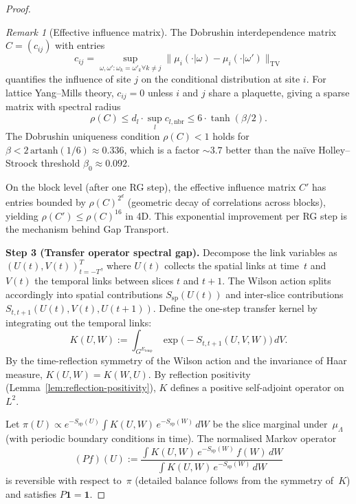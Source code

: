 \documentclass[12pt,a4paper]{article}
\theoremstyle{definition}
\theoremstyle{plain}
\theoremstyle{remark}
\newtheorem{remark}[definition]{Remark}
\begin{document}
\begin{proof}
\begin{remark}[Effective influence matrix]
\label{rem:influence-matrix}
The Dobrushin interdependence matrix $C = (c_{ij})$ with entries
\[
c_{ij} = \sup_{\omega, \omega': \omega_k = \omega'_k \forall k \neq j} \| \mu_i(\cdot | \omega) - \mu_i(\cdot | \omega') \|_{\mathrm{TV}}
\]
quantifies the influence of site $j$ on the conditional distribution at site $i$. For lattice Yang--Mills theory, $c_{ij} = 0$ unless $i$ and $j$ share a plaquette, giving a sparse matrix with spectral radius
\[
\rho(C) \leq d_l \cdot \sup_{l} c_{l, \mathrm{nbr}} \leq 6 \cdot \tanh(\beta/2).
\]
The Dobrushin uniqueness condition $\rho(C) < 1$ holds for $\beta < 2\,\mathrm{artanh}(1/6) \approx 0.336$, which is a factor $\sim 3.7$ better than the na\"ive Holley--Stroock threshold $\beta_0 \approx 0.092$.

On the block level (after one RG step), the effective influence matrix $C'$ has entries bounded by $\rho(C)^{2^d}$ (geometric decay of correlations across blocks), yielding $\rho(C') \leq \rho(C)^{16}$ in 4D. This exponential improvement per RG step is the mechanism behind Gap Transport.
\end{remark}

\medskip
\noindent\textbf{Step 3 (Transfer operator spectral gap).}
Decompose the link variables as $(U(t), V(t))_{t=-T}^T$, where $U(t)$ collects the spatial links at time~$t$ and $V(t)$ the temporal links between slices $t$ and $t+1$. The Wilson action splits accordingly into spatial contributions $S_{\mathrm{sp}}(U(t))$ and inter-slice contributions $S_{t,t+1}(U(t), V(t), U(t+1))$. Define the one-step transfer kernel by integrating out the temporal links:
\begin{equation}\label{eq:transfer-kernel}
    K(U, W) := \int_{G^{E_{\mathrm{temp}}}} \exp\!\bigl(-S_{t,t+1}(U, V, W)\bigr)\,dV.
\end{equation}
By the time-reflection symmetry of the Wilson action and the invariance of Haar measure, $K(U,W) = K(W,U)$. By reflection positivity (Lemma~\ref{lem:reflection-positivity}), $K$ defines a positive self-adjoint operator on $L^2$.

Let $\pi(U) \propto e^{-S_{\mathrm{sp}}(U)}\int K(U,W)\,e^{-S_{\mathrm{sp}}(W)}\,dW$ be the slice marginal under~$\mu_\Lambda$ (with periodic boundary conditions in time). The normalised Markov operator
\begin{equation}
    (Pf)(U) := \frac{\int K(U,W)\,e^{-S_{\mathrm{sp}}(W)}\,f(W)\,dW}{\int K(U,W)\,e^{-S_{\mathrm{sp}}(W)}\,dW}
\end{equation}
is reversible with respect to~$\pi$ (detailed balance follows from the symmetry of~$K$) and satisfies $P\mathbf{1} = \mathbf{1}$.


\end{proof}
\end{document}
